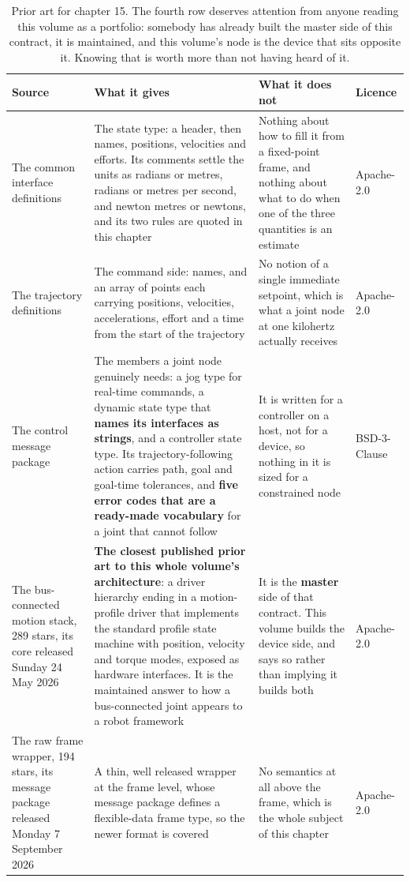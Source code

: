 \begin{table}[H]\centering\small
\begin{tabular}{p{34mm}p{46mm}p{38mm}p{20mm}}
\toprule
Source & What it gives & What it does not & Licence \\
\midrule
The common interface definitions & The state type: a header, then names,
positions, velocities and efforts. Its comments settle the units as radians or
metres, radians or metres per second, and newton metres or newtons, and its two
rules are quoted in this chapter & Nothing about how to fill it from a
fixed-point frame, and nothing about what to do when one of the three quantities
is an estimate & Apache-2.0 \\
The trajectory definitions & The command side: names, and an array of points
each carrying positions, velocities, accelerations, effort and a time from the
start of the trajectory & No notion of a single immediate setpoint, which is what
a joint node at one kilohertz actually receives & Apache-2.0 \\
The control message package & The members a joint node genuinely needs: a jog
type for real-time commands, a dynamic state type that \textbf{names its
interfaces as strings}, and a controller state type. Its trajectory-following
action carries path, goal and goal-time tolerances, and \textbf{five error codes
that are a ready-made vocabulary} for a joint that cannot follow & It is written
for a controller on a host, not for a device, so nothing in it is sized for a
constrained node & BSD-3-Clause \\
The bus-connected motion stack, 289 stars, its core released Sunday 24 May 2026 &
\textbf{The closest published prior art to this whole volume's architecture}: a
driver hierarchy ending in a motion-profile driver that implements the standard
profile state machine with position, velocity and torque modes, exposed as
hardware interfaces. It is the maintained answer to how a bus-connected joint
appears to a robot framework & It is the \textbf{master} side of that contract.
This volume builds the device side, and says so rather than implying it builds
both & Apache-2.0 \\
The raw frame wrapper, 194 stars, its message package released Monday 7 September
2026 & A thin, well released wrapper at the frame level, whose message package
defines a flexible-data frame type, so the newer format is covered & No semantics
at all above the frame, which is the whole subject of this chapter & Apache-2.0 \\
\bottomrule
\end{tabular}
\caption{Prior art for chapter 15. The fourth row deserves attention from anyone reading this volume as a portfolio: somebody has already built the master side of this contract, it is maintained, and this volume's node is the device that sits opposite it. Knowing that is worth more than not having heard of it.}
\end{table}

